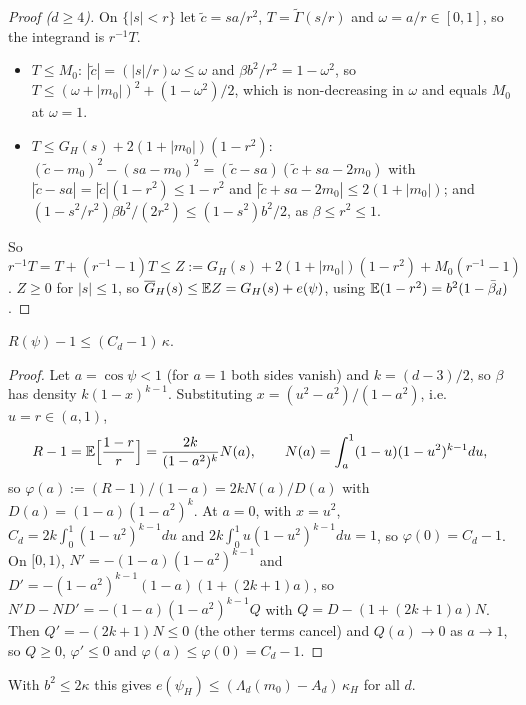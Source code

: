 \begin{proof}[Proof ($d \ge 4$)]
On $\{|s| < r\}$ let $\tilde c = sa/r^2$, $T = \tilde\Gamma(s/r)$ and $\omega = a/r \in [0, 1]$, so the integrand
is $r^{-1}T$.
\begin{itemize}
  \item $T \le M_0$: $|\tilde c| = (|s|/r)\omega \le \omega$ and $\beta b^2/r^2 = 1 - \omega^2$, so
    $T \le (\omega + |m_0|)^2 + (1 - \omega^2)/2$, which is non-decreasing in $\omega$ and equals $M_0$ at $\omega = 1$.
  \item $T \le G_H(s) + 2(1 + |m_0|)(1 - r^2)$: $(\tilde c - m_0)^2 - (sa - m_0)^2 = (\tilde c - sa)(\tilde c + sa - 2m_0)$
    with $|\tilde c - sa| = |\tilde c|(1 - r^2) \le 1 - r^2$ and $|\tilde c + sa - 2m_0| \le 2(1 + |m_0|)$; and
    $(1 - s^2/r^2)\beta b^2/(2r^2) \le (1 - s^2)b^2/2$, as $\beta \le r^2 \le 1$.
\end{itemize}
So $r^{-1}T = T + (r^{-1} - 1)T \le Z := G_H(s) + 2(1 + |m_0|)(1 - r^2) + M_0(r^{-1} - 1)$. $Z \ge 0$ for
$|s| \le 1$, so $\overline G_H(s) \le \mathbb{E} Z = G_H(s) + e(\psi)$, using $\mathbb{E}(1 - r^2) = b^2(1 - \bar\beta_d)$.
\end{proof}

\begin{lemma}[Lemma~R, $d \ge 4$]
$R(\psi) - 1 \le (C_d - 1)\, \kappa$.
\end{lemma}

\begin{proof}
Let $a = \cos\psi < 1$ (for $a = 1$ both sides vanish) and $k = (d-3)/2$, so $\beta$ has density $k(1-x)^{k-1}$.
Substituting $x = (u^2 - a^2)/(1 - a^2)$, i.e.\ $u = r \in (a, 1)$,
\[
  R - 1 = \mathbb{E}\Bigl[\frac{1 - r}{r}\Bigr] = \frac{2k}{(1 - a^2)^k}N(a), \qquad N(a) = \int_a^1(1 - u)(1 - u^2)^{k-1}du,
\]
so $\varphi(a) := (R - 1)/(1 - a) = 2kN(a)/D(a)$ with $D(a) = (1 - a)(1 - a^2)^k$. At $a = 0$, with $x = u^2$,
$C_d = 2k\int_0^1(1 - u^2)^{k-1}du$ and $2k\int_0^1u(1 - u^2)^{k-1}du = 1$, so $\varphi(0) = C_d - 1$. On $[0, 1)$,
$N' = -(1 - a)(1 - a^2)^{k-1}$ and $D' = -(1 - a^2)^{k-1}(1 - a)(1 + (2k + 1)a)$, so
$N'D - ND' = -(1 - a)(1 - a^2)^{k-1}Q$ with $Q = D - (1 + (2k+1)a)N$. Then $Q' = -(2k + 1)N \le 0$ (the other terms
cancel) and $Q(a) \to 0$ as $a \to 1$, so $Q \ge 0$, $\varphi' \le 0$ and $\varphi(a) \le \varphi(0) = C_d - 1$.
\end{proof}

With $b^2 \le 2\kappa$ this gives $e(\psi_H) \le (\Lambda_d(m_0) - A_d)\, \kappa_H$ for all $d$.

